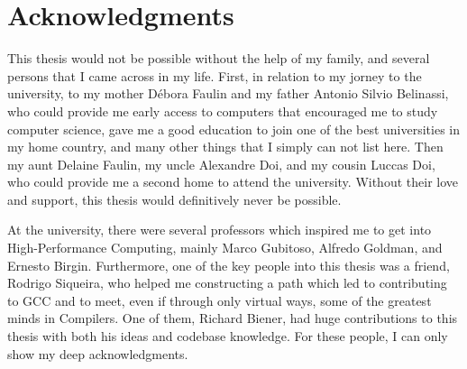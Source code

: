 



\chapter*{Acknowledgments}

This thesis would not be possible without the help of my family, and several
persons that I came across in my life. First, in relation to my jorney to the university, to
my mother Débora Faulin and my father Antonio Silvio Belinassi, who could
provide me early access to computers that encouraged me to study computer
science, gave me a good education to join one of the best universities in my home
country, and many other things that I simply can not list here. Then my aunt
Delaine Faulin, my uncle Alexandre Doi, and my cousin Luccas Doi, who could
provide me a second home to attend the university.  Without their love and
support, this thesis would  definitively never be possible.

At the university, there were several professors which inspired me to get into
High-Performance Computing, mainly Marco Gubitoso, Alfredo Goldman, and Ernesto
Birgin. Furthermore, one of the key people into this thesis was a friend,
Rodrigo Siqueira, who helped me constructing a path which led to contributing
to GCC and to meet, even if through only virtual ways, some of the greatest
minds in Compilers. One of them, Richard Biener, had huge contributions to this
thesis with both his ideas and codebase knowledge. For these people, I can
only show my deep acknowledgments.

